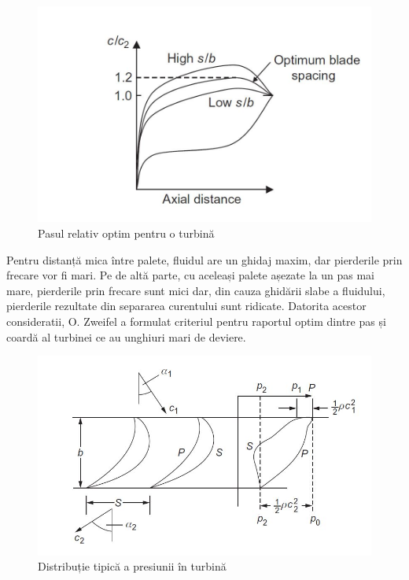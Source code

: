 \begin{figure}[h]
	\centering
	\includegraphics[scale=0.35]{figures/pasul_relativ_optim.jpg}
	\caption{Pasul relativ optim pentru o turbină \cite{hall2013fluid}}
	\label{Pasul relativ optim pentru o turbină}
\end{figure}

Pentru distanță mica între palete, fluidul are un ghidaj maxim, dar pierderile prin frecare vor fi mari. Pe de altă parte, cu aceleași palete așezate la un pas mai mare, pierderile prin frecare sunt mici dar, din cauza ghidării slabe a fluidului, pierderile rezultate din separarea curentului sunt ridicate. Datorita acestor consideratii, O. Zweifel \cite{zweifel1945frage} a formulat criteriul pentru raportul optim dintre pas și coardă al turbinei ce au unghiuri mari de deviere.

\begin{figure}[h]
	\centering
	\includegraphics[scale=0.5]{figures/distributia_presiunii.jpg}
	\caption{Distribuție tipică a presiunii în turbină \cite{hall2013fluid}}
	\label{Distribuție tipică a presiunii în turbină}
\end{figure}

